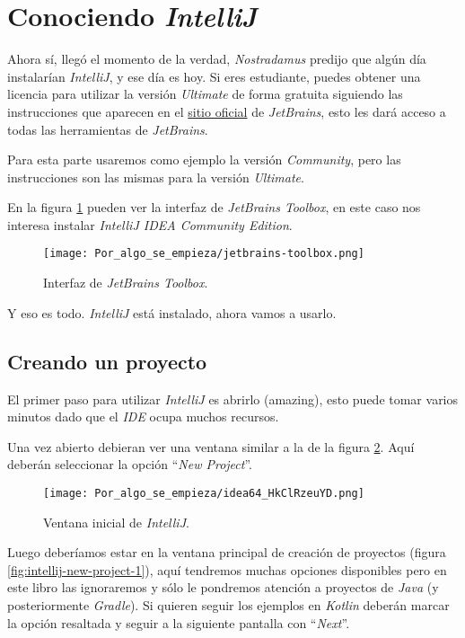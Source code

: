 \section{Conociendo \textit{IntelliJ}}
  Ahora sí, llegó el momento de la verdad, \textit{Nostradamus} predijo que algún día instalarían
  \textit{IntelliJ}, y ese día es hoy.
  Si eres estudiante, puedes obtener una licencia para utilizar la versión \textit{Ultimate} de
  forma gratuita siguiendo las instrucciones que aparecen en el 
  \href{https://www.jetbrains.com/community/education/#students}{sitio oficial} de 
  \textit{JetBrains}, esto les dará acceso a todas las herramientas de \textit{JetBrains}.

  Para esta parte usaremos como ejemplo la versión \textit{Community}, pero las instrucciones son
  las mismas para la versión \textit{Ultimate}.

  En la figura \ref{fig:jb-toolbox} pueden ver la interfaz de \textit{JetBrains Toolbox}, en este
  caso nos interesa instalar \textit{IntelliJ IDEA Community Edition}.

  \begin{figure}[ht!]
    \centering
    \texttt{[image: Por\_algo\_se\_empieza/jetbrains-toolbox.png]}
    \caption{Interfaz de \textit{JetBrains Toolbox}.}
    \label{fig:jb-toolbox}
  \end{figure}

  Y eso es todo.
  \textit{IntelliJ} está instalado, ahora vamos a usarlo.

  \subsection{Creando un proyecto}
    El primer paso para utilizar \textit{IntelliJ} es abrirlo (amazing), esto puede tomar varios 
    minutos dado que el \textit{IDE} ocupa muchos recursos.

    Una vez abierto debieran ver una ventana similar a la de la figura \ref{fig:intellij-landing}.
    Aquí deberán seleccionar la opción \enquote{\textit{New Project}}.

    \begin{figure}[ht!]
      \centering
      \texttt{[image: Por\_algo\_se\_empieza/idea64\_HkClRzeuYD.png]}
      \caption{Ventana inicial de \textit{IntelliJ}.}
      \label{fig:intellij-landing}
    \end{figure}

    Luego deberíamos estar en la ventana principal de creación de proyectos (figura 
    \ref{fig:intellij-new-project-1}), aquí tendremos muchas opciones disponibles pero en este
    libro las ignoraremos y sólo le pondremos atención a proyectos de \textit{Java} (y 
    posteriormente \textit{Gradle}).
    Si quieren seguir los ejemplos en \textit{Kotlin} deberán marcar la opción resaltada y seguir
    a la siguiente pantalla con \enquote{\textit{Next}}.

